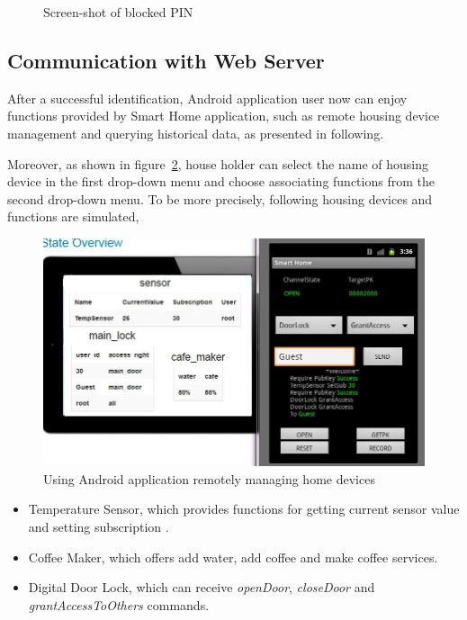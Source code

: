 \begin{figure}[!htb]
\begin{minipage}{0.49\linewidth}
  \caption{Screen-shot of blocked PIN}
  \label{fig:sub2}
\end{minipage}
  \end{figure}

\subsection{Communication with Web Server}
After a successful identification, Android application user now can enjoy functions provided by Smart Home application, such as remote housing device management and querying historical data, as presented in following.

Moreover, as shown in figure~\ref{fig:housing-device}, house holder can select the name of housing device in the first drop-down menu and  choose associating functions from the second drop-down menu. To be more precisely, following housing devices and functions are simulated,
\begin{figure}[!htb]
	\centering
	\includegraphics[width=1\textwidth]{Images/impl/housing-device.jpg}
		\caption{Using Android application remotely managing home devices}
	\label{fig:housing-device}
\end{figure}

\begin{itemize}
\item Temperature Sensor, which provides functions for getting current sensor value and setting subscription .
\item Coffee Maker,  which offers add water, add coffee and make coffee services.
\item Digital Door Lock, which can receive  \emph{openDoor}, \emph{closeDoor} and  \emph{grantAccessToOthers} commands.
\end{itemize}

